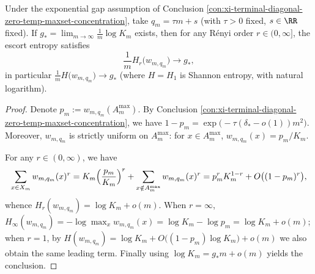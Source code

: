 \begin{conclusion}[Diagonal entropy plateau: when \texorpdfstring{$q=\tau m+O(1)$}{q=tau m+O(1)}, both Shannon and Rényi entropy rates of the escort collapse to \texorpdfstring{$g_\ast$}{g*}]\label{con:xi-terminal-diagonal-escort-entropy-plateau}
Under the exponential gap assumption of Conclusion \ref{con:xi-terminal-diagonal-zero-temp-maxset-concentration}, take \(q_m=\tau m+s\) (with \(\tau>0\) fixed, \(s\in\RR\) fixed).
If \(g_\ast=\lim_{m\to\infty}\frac{1}{m}\log K_m\) exists, then for any Rényi order \(r\in(0,\infty]\), the escort entropy satisfies
\[
\frac{1}{m}H_r\!\bigl(w_{m,q_m}\bigr)\longrightarrow g_\ast,
\]
in particular
\(
\frac{1}{m}H\!\bigl(w_{m,q_m}\bigr)\to g_\ast
\)
(where \(H=H_1\) is Shannon entropy, with natural logarithm).
\end{conclusion}
\begin{proof}
Denote \(p_m:=w_{m,q_m}(A_m^{\max})\).
By Conclusion \ref{con:xi-terminal-diagonal-zero-temp-maxset-concentration}, we have \(1-p_m=\exp\!\bigl(-\tau(\delta_\ast-o(1))m^2\bigr)\).
Moreover, \(w_{m,q_m}\) is strictly uniform on \(A_m^{\max}\): for \(x\in A_m^{\max}\), \(w_{m,q_m}(x)=p_m/K_m\).

\par
For any \(r\in(0,\infty)\), we have
\[
\sum_{x\in X_m}w_{m,q_m}(x)^r
=K_m\Bigl(\frac{p_m}{K_m}\Bigr)^r+\sum_{x\notin A_m^{\max}}w_{m,q_m}(x)^r
=p_m^rK_m^{1-r}+O\bigl((1-p_m)^r\bigr),
\]
whence
\(
H_r(w_{m,q_m})=\log K_m+o(m)
\).
When \(r=\infty\),
\(
H_\infty(w_{m,q_m})=-\log\max_x w_{m,q_m}(x)=\log K_m-\log p_m=\log K_m+o(m)
\);
when \(r=1\), by
\(
H(w_{m,q_m})=\log K_m+O\bigl((1-p_m)\log K_m\bigr)+o(m)
\)
we also obtain the same leading term.
Finally using \(\log K_m=g_\ast m+o(m)\) yields the conclusion.
\end{proof}

